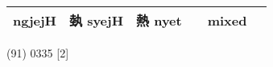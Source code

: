 \documentclass[14pt,a4paper]{scrartcl}
\begin{document}
\begin{longtable}[c]{@{}llllll@{}}
\begin{minipage}[t]{0.14\columnwidth}\raggedright\strut
ngjejH
\strut\end{minipage} &
\begin{minipage}[t]{0.14\columnwidth}\raggedright\strut
埶 syejH
\strut\end{minipage} &
\begin{minipage}[t]{0.14\columnwidth}\raggedright\strut
熱 nyet
\strut\end{minipage} &
\begin{minipage}[t]{0.14\columnwidth}\raggedright\strut
\strut\end{minipage} &
\begin{minipage}[t]{0.14\columnwidth}\raggedright\strut
mixed
\strut\end{minipage}\tabularnewline
\bottomrule
\end{longtable}

(91) 0335 {[}2{]}
\end{document}
